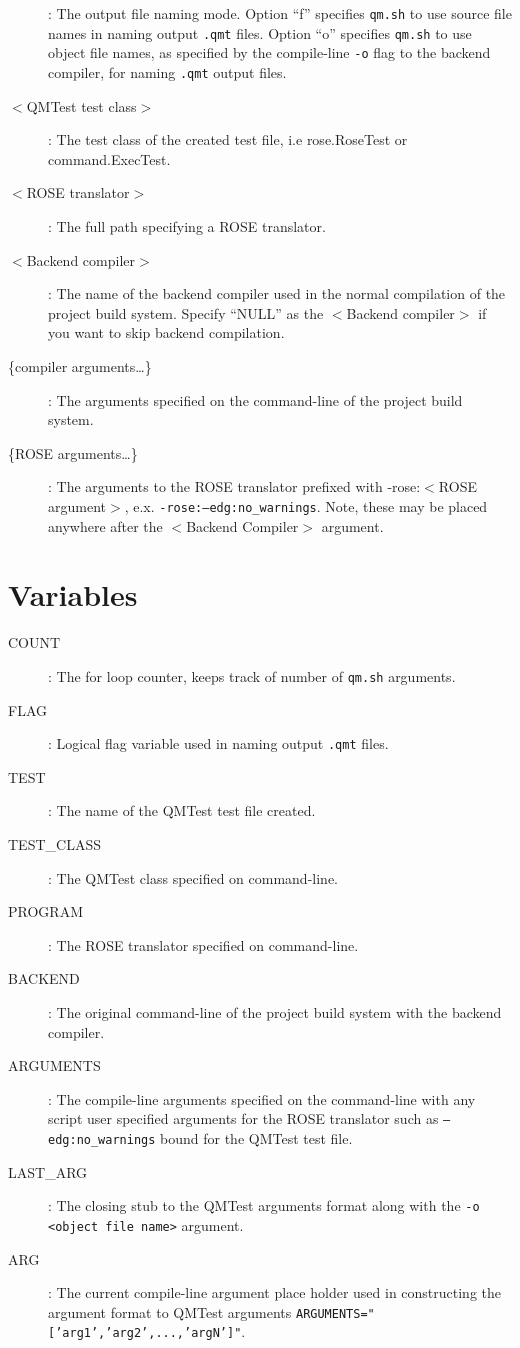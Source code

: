 \begin{description}
  \item[{\large {\tt <f|o>}}] : The output file naming mode. Option ``f'' specifies
	{\tt qm.sh} to use source file names in naming output {\tt .qmt} files.
	Option ``o'' specifies {\tt qm.sh} to use object file names, as
	specified by the compile-line {\tt -o} flag to the backend compiler,
	for naming {\tt .qmt} output files.
  \item[$<$QMTest test class$>$] : The test class of the created test file,
	i.e rose.RoseTest or command.ExecTest.
  \item[$<$ROSE translator$>$] : The full path specifying a ROSE translator.
  \item[$<$Backend compiler$>$] : The name of the backend compiler used in
	the normal compilation of the project build system. Specify ``NULL'' as
	the $<$Backend compiler$>$ if you want to skip backend compilation.
  \item[\{compiler arguments\ldots\}] : The arguments specified on
	the command-line of the project build system.
  \item[\{ROSE arguments\ldots\}] : The arguments to the ROSE translator
	prefixed with -rose:$<$ROSE argument$>$, e.x. 
	{\tt -rose:--edg:no\_warnings}. Note, these may be placed anywhere
	after the $<$Backend Compiler$>$ argument.
\end{description}

\section{Variables}

\begin{description}
  \item[COUNT] : The for loop counter, keeps track of number of {\tt qm.sh}
	arguments.
  \item[FLAG] : Logical flag variable used in naming output {\tt .qmt} files.
  \item[TEST] : The name of the QMTest test file created.
  \item[TEST\_CLASS] : The QMTest class specified on command-line.
  \item[PROGRAM] : The ROSE translator specified on command-line.
  \item[BACKEND] : The original command-line of the project build system with
	the backend compiler.
  \item[ARGUMENTS] : The compile-line arguments specified on the command-line
	with any script user specified arguments for the ROSE translator such
	as {\tt --edg:no\_warnings} bound for the QMTest test file.
  \item[LAST\_ARG] : The closing stub to the QMTest arguments format along with
	the {\tt -o <object file name>} argument.
  \item[ARG] : The current compile-line argument place holder used in
	constructing the argument format to QMTest arguments
	{\tt ARGUMENTS="['arg1','arg2',...,'argN']"}. 

\end{description}


